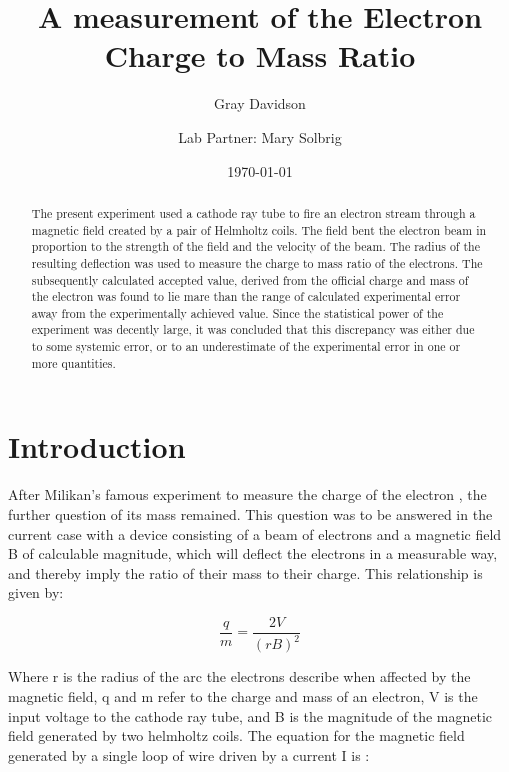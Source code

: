 \documentclass[aps,pre,twocolumn,nofootinbib]{revtex4}
\begin{document}
\title{A measurement of the Electron Charge to Mass Ratio}

\author{Gray Davidson}
\author{Lab Partner: Mary Solbrig }

\date{\today}

\begin{abstract}  
The present experiment used a cathode ray tube to fire an electron stream through a magnetic field created by a pair of Helmholtz coils.  The field bent the electron beam in proportion to the strength of the field and the velocity of the beam.  The radius of the resulting deflection was used to measure the charge to mass ratio of the electrons.  The subsequently calculated accepted value, derived from the official charge and mass of the electron was found to lie mare than the range of calculated experimental error away from the experimentally achieved value.  Since the statistical power of the experiment was decently large, it was concluded that this discrepancy was either due to some systemic error, or to an underestimate of the experimental error in one or more quantities.  
\end{abstract}
\maketitle

\section{Introduction}
After Milikan's famous experiment to measure the charge of the electron \cite{Scribner2008}, the further question of its mass remained.  This question was to be answered in the current case with a device consisting of a beam of electrons and a magnetic field B of calculable magnitude, which will deflect the electrons in a measurable way, and thereby imply the ratio of their mass to their charge.  This relationship is given by: 

\begin{equation}
\label{qoverm}
\frac{q}{m}=\frac{2V}{(rB)^2}
\end{equation}

Where r is the radius of the arc the electrons describe when affected by the magnetic field,  q and m refer to the charge and mass of an electron, V is the input voltage to the cathode ray tube, and B is the magnitude of the magnetic field generated by two helmholtz coils.  The equation for the magnetic field generated by a single loop of wire driven by a current I is \cite{Giancoli}:
\end{document}
